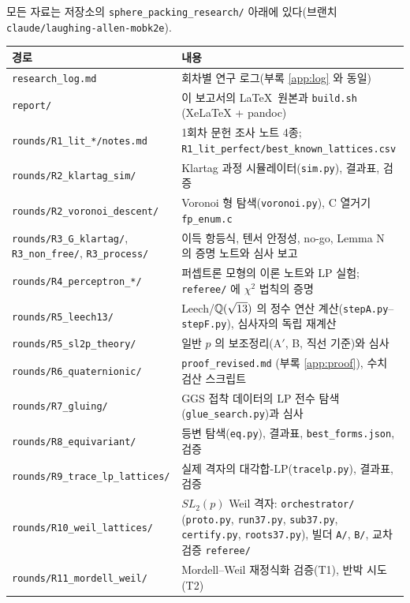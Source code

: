 모든 자료는 저장소의 \texttt{sphere\_packing\_research/} 아래에 있다(브랜치 \texttt{claude/laughing-allen-mobk2e}).
\begin{center}\small
\begin{longtable}{@{}p{5.6cm}p{10.4cm}@{}}
\toprule
경로 & 내용\\
\midrule
\endhead
\texttt{research\_log.md} & 회차별 연구 로그(부록 \ref{app:log} 와 동일)\\
\texttt{report/} & 이 보고서의 \LaTeX\ 원본과 \texttt{build.sh} (XeLaTeX + pandoc)\\
\texttt{rounds/R1\_lit\_*/notes.md} & 1회차 문헌 조사 노트 4종; \texttt{R1\_lit\_perfect/best\_known\_lattices.csv}\\
\texttt{rounds/R2\_klartag\_sim/} & Klartag 과정 시뮬레이터(\texttt{sim.py}), 결과표, 검증\\
\texttt{rounds/R2\_voronoi\_descent/} & Voronoi 형 탐색(\texttt{voronoi.py}), C 열거기 \texttt{fp\_enum.c}\\
\texttt{rounds/R3\_G\_klartag/}, \texttt{R3\_non\_free/}, \texttt{R3\_process/} & 이득 항등식, 텐서 안정성, no-go, Lemma N 의 증명 노트와 심사 보고\\
\texttt{rounds/R4\_perceptron\_*/} & 퍼셉트론 모형의 이론 노트와 LP 실험; \texttt{referee/} 에 $\chi^2$ 법칙의 증명\\
\texttt{rounds/R5\_leech13/} & Leech/$\mathbb{Q}(\sqrt{13})$ 의 정수 연산 계산(\texttt{stepA.py}--\texttt{stepF.py}), 심사자의 독립 재계산\\
\texttt{rounds/R5\_sl2p\_theory/} & 일반 $p$ 의 보조정리(A$'$, B, 직선 기준)와 심사\\
\texttt{rounds/R6\_quaternionic/} & \texttt{proof\_revised.md} (부록 \ref{app:proof}), 수치 검산 스크립트\\
\texttt{rounds/R7\_gluing/} & GGS 접착 데이터의 LP 전수 탐색(\texttt{glue\_search.py})과 심사\\
\texttt{rounds/R8\_equivariant/} & 등변 탐색(\texttt{eq.py}), 결과표, \texttt{best\_forms.json}, 검증\\
\texttt{rounds/R9\_trace\_lp\_lattices/} & 실제 격자의 대각합-LP(\texttt{tracelp.py}), 결과표, 검증\\
\texttt{rounds/R10\_weil\_lattices/} & $SL_2(p)$ Weil 격자: \texttt{orchestrator/} (\texttt{proto.py}, \texttt{run37.py}, \texttt{sub37.py}, \texttt{certify.py}, \texttt{roots37.py}), 빌더 \texttt{A/}, \texttt{B/}, 교차검증 \texttt{referee/}\\
\texttt{rounds/R11\_mordell\_weil/} & Mordell--Weil 재정식화 검증(T1), 반박 시도(T2)\\

\end{longtable}
\end{center}
